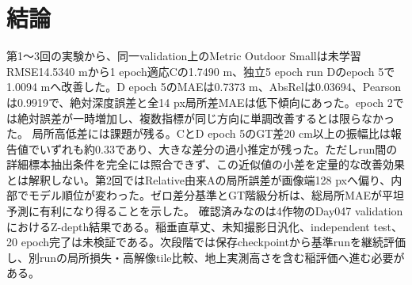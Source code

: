 \chapter{結論}
第1〜3回の実験から、同一validation上のMetric Outdoor Smallは未学習RMSE14.5340 mから1 epoch適応Cの1.7490 m、独立5 epoch run Dのepoch 5で1.0094 mへ改善した。D epoch 5のMAEは0.7373 m、AbsRelは0.03694、Pearsonは0.9919で、絶対深度誤差と全14 px局所差MAEは低下傾向にあった。epoch 2では絶対誤差が一時増加し、複数指標が同じ方向に単調改善するとは限らなかった。
局所高低差には課題が残る。CとD epoch 5のGT差20 cm以上の振幅比は報告値でいずれも約0.33であり、大きな差分の過小推定が残った。ただしrun間の詳細標本抽出条件を完全には照合できず、この近似値の小差を定量的な改善効果とは解釈しない。第2回ではRelative由来Aの局所誤差が画像端128 pxへ偏り、内部でモデル順位が変わった。ゼロ差分基準とGT階級分析は、総局所MAEが平坦予測に有利になり得ることを示した。
確認済みなのは4作物のDay047 validationにおけるZ-depth結果である。稲垂直草丈、未知撮影日汎化、independent test、20 epoch完了は未検証である。次段階では保存checkpointから基準runを継続評価し、別runの局所損失・高解像tile比較、地上実測高さを含む稲評価へ進む必要がある。
